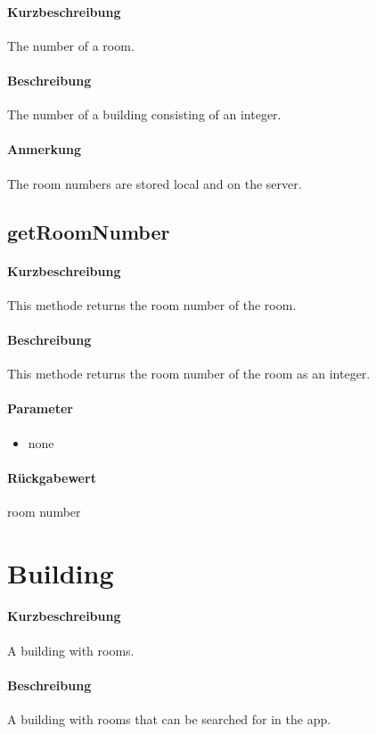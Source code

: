 \paragraph*{Kurzbeschreibung}
The number of a room.
\paragraph*{Beschreibung}
The number of a building consisting of an integer.
\paragraph*{Anmerkung}
The room numbers are stored local and on the server.

\subsection{getRoomNumber}%
\paragraph*{Kurzbeschreibung}
This methode returns the room number of the room.
\paragraph*{Beschreibung}
This methode returns the room number of the room as an integer.
\paragraph*{Parameter}
\begin{itemize}
    \item none
\end{itemize}
\paragraph*{Rückgabewert}
room number


\section{Building}
\paragraph*{Kurzbeschreibung}
A building with rooms.
\paragraph*{Beschreibung}
A building with rooms that can be searched for in the app.
